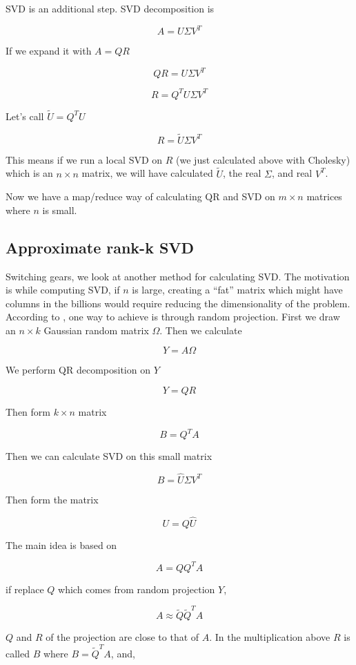 \documentclass[11pt]{article}
\begin{document}
SVD is an additional step. SVD decomposition is 

$$ A = U \Sigma V^T $$

If we expand it with $A = QR$

$$ QR =  U \Sigma V^T $$

$$ R =  Q^T U \Sigma V^T $$

Let's call $\tilde{U} = Q^T U$

$$ R =  \tilde{U} \Sigma V^T $$

This means if we run a local SVD on $R$ (we just calculated above with
Cholesky) which is an $n \times n$ matrix, we will have calculated
$\tilde{U}$, the real $\Sigma$, and real $V^T$. 

Now we have a map/reduce way of calculating QR and SVD on $m \times n$
matrices where $n$ is small.

\subsection{Approximate rank-k SVD}

Switching gears, we look at another method for calculating SVD. The
motivation is while computing SVD, if $n$ is large, creating a ``fat''
matrix which might have columns in the billions would require reducing the
dimensionality of the problem. According to \cite{halko}, one way to
achieve is through random projection. First we draw an $n \times k$
Gaussian random matrix $\Omega$. Then we calculate

$$ Y = A \Omega $$

We perform QR decomposition on $Y$

$$ Y = QR $$

Then form $k \times n$ matrix

$$ B = Q^T A \label{bt} $$

Then we can calculate SVD on this small matrix

$$ B = \hat{U} \Sigma V^T $$

Then form the matrix 

$$ U = Q \hat{U} $$

The main idea is based on

$$ A = QQ^T A $$

if replace $Q$ which comes from random projection $Y$, 

$$ A \approx \tilde{Q}\tilde{Q}^T A $$

$Q$ and $R$ of the projection are close to that of $A$. In the
multiplication above $R$ is called $B$ where $B = \tilde{Q}^T A $, and,
\end{document}
